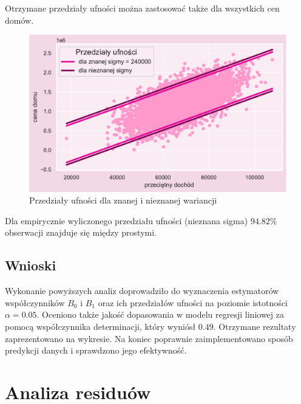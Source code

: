 \documentclass{article}
\begin{document}
\noindent Otrzymane przedziały ufności można zastosować także dla wszystkich cen domów.
 
 \begin{figure}[H]
	\begin{center}
		\includegraphics[scale=0.68]{images/przedzialy_ufnosci.pdf}
		\caption{Przedziały ufności dla znanej i nieznanej wariancji}
		\label{denistyx}
	\end{center}
	\end{figure}

 \noindent Dla empirycznie wyliczonego przedziału ufności (nieznana sigma) $94.82\%$ obserwacji znajduje się między prostymi. 

\subsection{Wnioski}
Wykonanie powyższych analiz doprowadziło do wyznaczenia estymatorów współczynników $B_0$ i $B_1$ oraz ich przedziałów ufności na poziomie istotności $\alpha = 0.05$. Oceniono także jakość dopasowania w modelu regresji liniowej za pomocą współczynnika determinacji, który wyniósł $0.49$. Otrzymane rezultaty zaprezentowano na wykresie. Na koniec poprawnie zaimplementowano sposób predykcji danych i sprawdzono jego efektywność.
\section{Analiza residuów}
\end{document}
